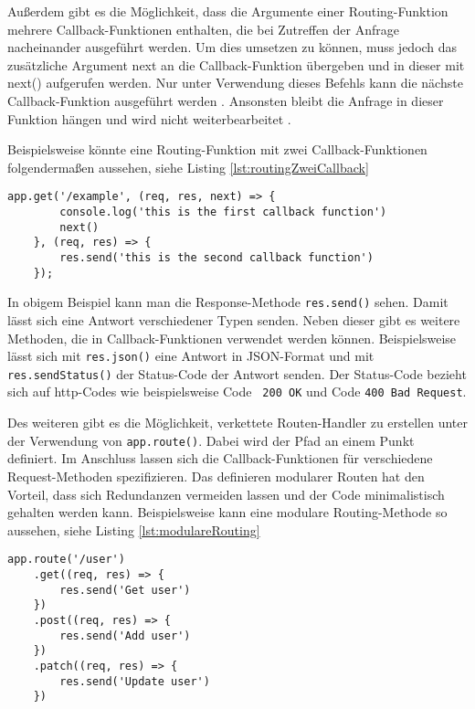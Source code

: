 Außerdem gibt es die Möglichkeit, dass die Argumente einer Routing-Funktion mehrere Callback-Funktionen enthalten, die bei Zutreffen der Anfrage nacheinander ausgeführt werden. Um dies umsetzen zu können, muss jedoch das zusätzliche Argument \glqq next\grqq{} an die Callback-Funktion übergeben und in dieser mit next() aufgerufen werden. Nur unter Verwendung dieses Befehls kann die nächste Callback-Funktion ausgeführt werden \cite{nfunf}. Ansonsten bleibt die Anfrage in dieser Funktion hängen und wird nicht weiterbearbeitet \cite{nsechs}.

Beispielsweise könnte eine Routing-Funktion mit zwei Callback-Funktionen folgendermaßen aussehen, siehe Listing \ref*{lst:routingZweiCallback}

\begin{lstlisting}[caption={Routing-Funktion mit zwei Callback-Funktionen}, label={lst:routingZweiCallback}]
    app.get('/example', (req, res, next) => {
        console.log('this is the first callback function')
        next()
    }, (req, res) => {
        res.send('this is the second callback function')
    });
\end{lstlisting}

In obigem Beispiel kann man die Response-Methode \texttt{res.send()} sehen. Damit lässt sich eine Antwort verschiedener Typen senden. Neben dieser gibt es weitere Methoden, die in Callback-Funktionen verwendet werden können. Beispielsweise lässt sich mit \texttt{res.json()} eine Antwort in JSON-Format und mit \texttt{res.sendStatus()} der Status-Code der Antwort senden. Der Status-Code bezieht sich auf http-Codes wie beispielsweise Code  \texttt{ 200 OK} und Code  \texttt{400 Bad Request}.

Des weiteren gibt es die Möglichkeit, verkettete Routen-Handler zu erstellen unter der Verwendung von \texttt{app.route()}. Dabei wird der Pfad an einem Punkt definiert. Im Anschluss lassen sich die Callback-Funktionen für verschiedene Request-Methoden spezifizieren. Das definieren modularer Routen hat den Vorteil, dass sich Redundanzen vermeiden lassen und der Code minimalistisch gehalten werden kann. 
Beispielsweise kann eine modulare Routing-Methode so aussehen, siehe Listing \ref*{lst:modulareRouting}

\begin{lstlisting}[caption={Modulare Routing Methode \cite{nfunf}}, label={lst:modulareRouting}]
    app.route('/user')
    .get((req, res) => {
        res.send('Get user')
    })
    .post((req, res) => {
        res.send('Add user')
    })
    .patch((req, res) => {
        res.send('Update user')
    })
\end{lstlisting}

